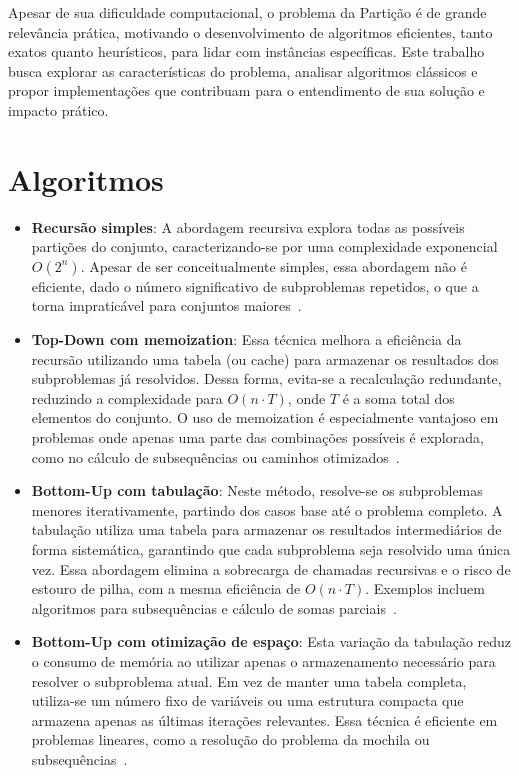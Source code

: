 \documentclass{article}
\begin{document}
Apesar de sua dificuldade computacional, o problema da Partição é de grande relevância prática, motivando o desenvolvimento de algoritmos eficientes, tanto exatos quanto heurísticos, para lidar com instâncias específicas. Este trabalho busca explorar as características do problema, analisar algoritmos clássicos e propor implementações que contribuam para o entendimento de sua solução e impacto prático.

\section{Algoritmos}

\begin{itemize}
\item \textbf{Recursão simples}: A abordagem recursiva explora todas as possíveis partições do conjunto, caracterizando-se por uma complexidade exponencial \(O(2^n)\). Apesar de ser conceitualmente simples, essa abordagem não é eficiente, dado o número significativo de subproblemas repetidos, o que a torna impraticável para conjuntos maiores~\cite{cormen2009introduction}.

\item \textbf{Top-Down com memoization}: Essa técnica melhora a eficiência da recursão utilizando uma tabela (ou cache) para armazenar os resultados dos subproblemas já resolvidos. Dessa forma, evita-se a recalculação redundante, reduzindo a complexidade para \(O(n \cdot T)\), onde \(T\) é a soma total dos elementos do conjunto. O uso de memoization é especialmente vantajoso em problemas onde apenas uma parte das combinações possíveis é explorada, como no cálculo de subsequências ou caminhos otimizados~\cite{cormen2009introduction}.

\item \textbf{Bottom-Up com tabulação}: Neste método, resolve-se os subproblemas menores iterativamente, partindo dos casos base até o problema completo. A tabulação utiliza uma tabela para armazenar os resultados intermediários de forma sistemática, garantindo que cada subproblema seja resolvido uma única vez. Essa abordagem elimina a sobrecarga de chamadas recursivas e o risco de estouro de pilha, com a mesma eficiência de \(O(n \cdot T)\). Exemplos incluem algoritmos para subsequências e cálculo de somas parciais~\cite{cormen2009introduction, garey1979computers}.

\item \textbf{Bottom-Up com otimização de espaço}: Esta variação da tabulação reduz o consumo de memória ao utilizar apenas o armazenamento necessário para resolver o subproblema atual. Em vez de manter uma tabela completa, utiliza-se um número fixo de variáveis ou uma estrutura compacta que armazena apenas as últimas iterações relevantes. Essa técnica é eficiente em problemas lineares, como a resolução do problema da mochila ou subsequências~\cite{cormen2009introduction, garey1979computers}.
\end{itemize}
\end{document}
